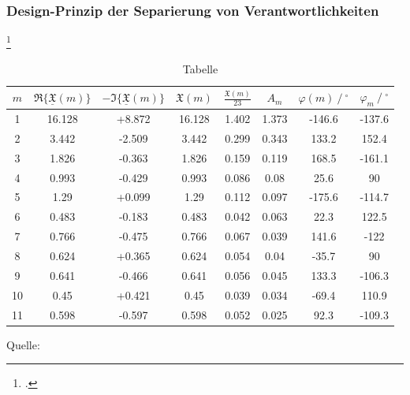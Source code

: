 \subsubsection{Design-Prinzip der Separierung von Verantwortlichkeiten}
\blindtext\footcite[][79]{Schelinski2019}

\begin{table}[h]
    \centering
    \begin{threeparttable}
        \centering
        \caption{Tabelle}
        \begin{tabular}{cccccccc}
            {$m$} & {$\Re\{\underline{\mathfrak{X}}(m)\}$} & {$-\Im\{\underline{\mathfrak{X}}(m)\}$} & {$\mathfrak{X}(m)$} & {$\frac{\mathfrak{X}(m)}{23}$} & {$A_m$} & {$\varphi(m)\ /\ ^{\circ}$} & {$\varphi_m\ /\ ^{\circ}$} \\
            \hline
            1  & 16.128 & +8.872 & 16.128 & 1.402 & 1.373 & -146.6 & -137.6 \\
            2  & 3.442  & -2.509 & 3.442  & 0.299 & 0.343 & 133.2  & 152.4  \\
            3  & 1.826  & -0.363 & 1.826  & 0.159 & 0.119 & 168.5  & -161.1 \\
            4  & 0.993  & -0.429 & 0.993  & 0.086 & 0.08  & 25.6   & 90     \\
            5  & 1.29   & +0.099 & 1.29   & 0.112 & 0.097 & -175.6 & -114.7 \\
            6  & 0.483  & -0.183 & 0.483  & 0.042 & 0.063 & 22.3   & 122.5  \\
            7  & 0.766  & -0.475 & 0.766  & 0.067 & 0.039 & 141.6  & -122   \\
            8  & 0.624  & +0.365 & 0.624  & 0.054 & 0.04  & -35.7  & 90     \\
            9  & 0.641  & -0.466 & 0.641  & 0.056 & 0.045 & 133.3  & -106.3 \\
            10 & 0.45   & +0.421 & 0.45   & 0.039 & 0.034 & -69.4  & 110.9  \\
            11 & 0.598  & -0.597 & 0.598  & 0.052 & 0.025 & 92.3   & -109.3 \\
            \hline
        \end{tabular}
        \begin{tablenotes}[flushleft]
        \item \normalsize{Quelle: \cite[][200]{bsp}}
        \end{tablenotes}
    \end{threeparttable}
\end{table}

